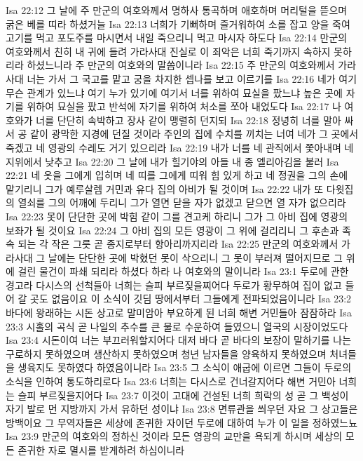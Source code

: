 Isa 22:12  그 날에 주 만군의 여호와께서 명하사 통곡하며 애호하며 머리털을 뜯으며 굵은 베를 띠라 하셨거늘
Isa 22:13  너희가 기뻐하며 즐거워하여 소를 잡고 양을 죽여 고기를 먹고 포도주를 마시면서 내일 죽으리니 먹고 마시자 하도다
Isa 22:14  만군의 여호와께서 친히 내 귀에 들려 가라사대 진실로 이 죄악은 너희 죽기까지 속하지 못하리라 하셨느니라 주 만군의 여호와의 말씀이니라
Isa 22:15  주 만군의 여호와께서 가라사대 너는 가서 그 국고를 맡고 궁을 차지한 셉나를 보고 이르기를
Isa 22:16  네가 여기 무슨 관계가 있느냐 여기 누가 있기에 여기서 너를 위하여 묘실을 팠느냐 높은 곳에 자기를 위하여 묘실을 팠고 반석에 자기를 위하여 처소를 쪼아 내었도다
Isa 22:17  나 여호와가 너를 단단히 속박하고 장사 같이 맹렬히 던지되
Isa 22:18  정녕히 너를 말아 싸서 공 같이 광막한 지경에 던질 것이라 주인의 집에 수치를 끼치는 너여 네가 그 곳에서 죽겠고 네 영광의 수레도 거기 있으리라
Isa 22:19  내가 너를 네 관직에서 쫓아내며 네 지위에서 낮추고
Isa 22:20  그 날에 내가 힐기야의 아들 내 종 엘리아김을 불러
Isa 22:21  네 옷을 그에게 입히며 네 띠를 그에게 띠워 힘 있게 하고 네 정권을 그의 손에 맡기리니 그가 예루살렘 거민과 유다 집의 아비가 될 것이며
Isa 22:22  내가 또 다윗집의 열쇠를 그의 어깨에 두리니 그가 열면 닫을 자가 없겠고 닫으면 열 자가 없으리라
Isa 22:23  못이 단단한 곳에 박힘 같이 그를 견고케 하리니 그가 그 아비 집에 영광의 보좌가 될 것이요
Isa 22:24  그 아비 집의 모든 영광이 그 위에 걸리리니 그 후손과 족속 되는 각 작은 그릇 곧 종지로부터 항아리까지리라
Isa 22:25  만군의 여호와께서 가라사대 그 날에는 단단한 곳에 박혔던 못이 삭으리니 그 못이 부러져 떨어지므로 그 위에 걸린 물건이 파쇄 되리라 하셨다 하라 나 여호와의 말이니라
Isa 23:1  두로에 관한 경고라 다시스의 선척들아 너희는 슬피 부르짖을찌어다 두로가 황무하여 집이 없고 들어 갈 곳도 없음이요 이 소식이 깃딤 땅에서부터 그들에게 전파되었음이니라
Isa 23:2  바다에 왕래하는 시돈 상고로 말미암아 부요하게 된 너희 해변 거민들아 잠잠하라
Isa 23:3  시홀의 곡식 곧 나일의 추수를 큰 물로 수운하여 들였으니 열국의 시장이었도다
Isa 23:4  시돈이여 너는 부끄러워할지어다 대저 바다 곧 바다의 보장이 말하기를 나는 구로하지 못하였으며 생산하지 못하였으며 청년 남자들을 양육하지 못하였으며 처녀들을 생육지도 못하였다 하였음이니라
Isa 23:5  그 소식이 애굽에 이르면 그들이 두로의 소식을 인하여 통도하리로다
Isa 23:6  너희는 다시스로 건너갈지어다 해변 거민아 너희는 슬피 부르짖을지어다
Isa 23:7  이것이 고대에 건설된 너희 희락의 성 곧 그 백성이 자기 발로 먼 지방까지 가서 유하던 성이냐
Isa 23:8  면류관을 씌우던 자요 그 상고들은 방백이요 그 무역자들은 세상에 존귀한 자이던 두로에 대하여 누가 이 일을 정하였느뇨
Isa 23:9  만군의 여호와의 정하신 것이라 모든 영광의 교만을 욕되게 하시며 세상의 모든 존귀한 자로 멸시를 받게하려 하심이니라
